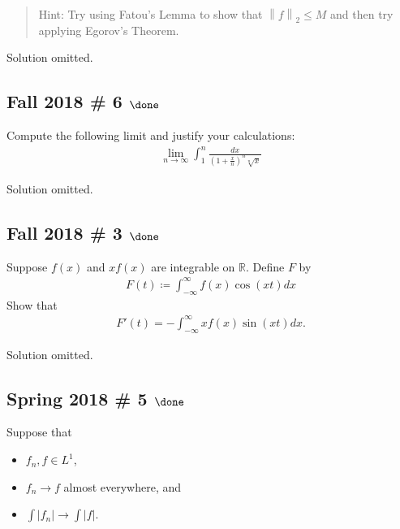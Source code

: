 \begin{quote}
Hint: Try using Fatou's Lemma to show that
\({\left\lVert {f} \right\rVert}_2 ≤ M\) and then try applying Egorov's
Theorem.
\end{quote}

Solution omitted.

\hypertarget{fall-2018-6-done}{%
\subsection{\texorpdfstring{Fall 2018 \# 6
\(\done\)}{Fall 2018 \# 6 \textbackslash done}}\label{fall-2018-6-done}}

Compute the following limit and justify your calculations:
\begin{align*}
\lim_{n \rightarrow \infty} \int_{1}^{n} \frac{d x}{\left(1+\frac{x}{n}\right)^{n} \sqrt[n]{x}}
\end{align*}


Solution omitted.

\hypertarget{fall-2018-3-done}{%
\subsection{\texorpdfstring{Fall 2018 \# 3
\(\done\)}{Fall 2018 \# 3 \textbackslash done}}\label{fall-2018-3-done}}

Suppose \(f(x)\) and \(xf(x)\) are integrable on \({\mathbb{R}}\).
Define \(F\) by
\begin{align*}
F(t)\coloneqq\int _{-\infty}^{\infty} f(x) \cos (x t) dx
\end{align*}
Show that
\begin{align*}
F'(t)=-\int _{-\infty}^{\infty} x f(x) \sin (x t) dx
.\end{align*}


Solution omitted.

\hypertarget{spring-2018-5-done}{%
\subsection{\texorpdfstring{Spring 2018 \# 5
\(\done\)}{Spring 2018 \# 5 \textbackslash done}}\label{spring-2018-5-done}}

Suppose that

\begin{itemize}
\tightlist
\item
  \(f_n, f \in L^1\),
\item
  \(f_n \to f\) almost everywhere, and
\item
  \(\int\left|f_{n}\right| \rightarrow \int|f|\).
\end{itemize}

